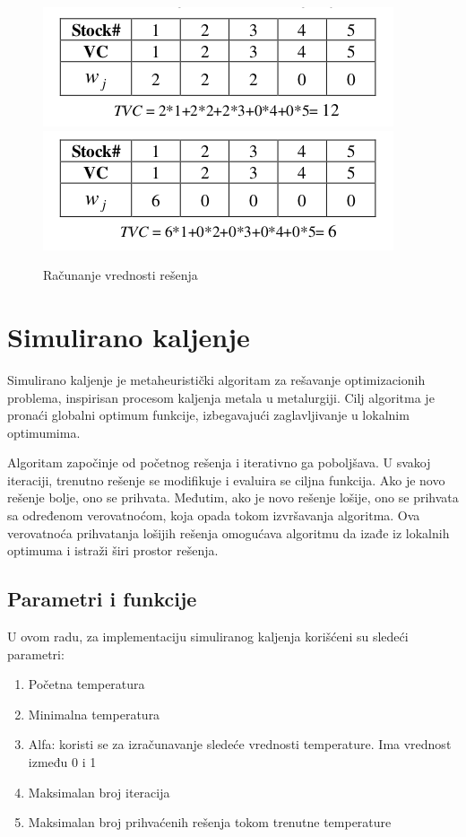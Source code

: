 \documentclass[12pt, a4paper]{article}
\begin{document}

\begin{figure}[h]
    \centering
    \includegraphics[width=0.45\linewidth]{img/vrednost_resenja_1.png}\hfill
    \includegraphics[width=0.45\linewidth]{img/vrednost_resenja_2.png}
    \caption{Računanje vrednosti rešenja}
\end{figure}

\vspace{0.5cm}

\section{Simulirano kaljenje}
Simulirano kaljenje je metaheuristički algoritam za rešavanje optimizacionih problema, inspirisan procesom kaljenja metala u metalurgiji. Cilj algoritma je pronaći globalni optimum funkcije, izbegavajući zaglavljivanje u lokalnim optimumima.

Algoritam započinje od početnog rešenja i iterativno ga poboljšava. U svakoj iteraciji, trenutno rešenje se modifikuje i evaluira se ciljna funkcija. Ako je novo rešenje bolje, ono se prihvata. Međutim, ako je novo rešenje lošije, ono se prihvata sa određenom verovatnoćom, koja opada tokom izvršavanja algoritma. Ova verovatnoća prihvatanja lošijih rešenja omogućava algoritmu da izađe iz lokalnih optimuma i istraži širi prostor rešenja. \\

\subsection{Parametri i funkcije}
U ovom radu, za implementaciju simuliranog kaljenja korišćeni su sledeći parametri:
\begin{enumerate}
	\item Početna temperatura
	\item Minimalna temperatura
	\item Alfa: koristi se za izračunavanje sledeće vrednosti temperature. Ima vrednost između 0 i 1
	\item Maksimalan broj iteracija
	\item Maksimalan broj prihvaćenih rešenja tokom trenutne temperature \\
\end{enumerate}
\end{document}

